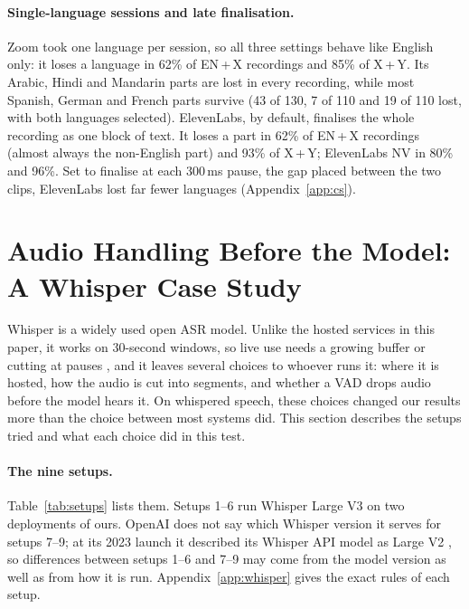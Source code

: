 \documentclass[11pt]{article}
\begin{document}
\paragraph{Single-language sessions and late finalisation.} Zoom took one language per session, so all three settings behave like English only: it loses a language in 62\% of EN\,+\,X recordings and 85\% of X\,+\,Y. Its Arabic, Hindi and Mandarin parts are lost in every recording, while most Spanish, German and French parts survive (43 of 130, 7 of 110 and 19 of 110 lost, with both languages selected). ElevenLabs, by default, finalises the whole recording as one block of text. It loses a part in 62\% of EN\,+\,X recordings (almost always the non-English part) and 93\% of X\,+\,Y; ElevenLabs NV in 80\% and 96\%. Set to finalise at each 300\,ms pause, the gap placed between the two clips, ElevenLabs lost far fewer languages (Appendix~\ref{app:cs}).

\FloatBarrier
\section{Audio Handling Before the Model: A Whisper Case Study}\label{sec:whisperguide}
Whisper is a widely used open ASR model. Unlike the hosted services in this paper, it works on 30-second windows, so live use needs a growing buffer \citep{machacek2023whisperstreaming} or cutting at pauses \citep{bain2023whisperx}, and it leaves several choices to whoever runs it: where it is hosted, how the audio is cut into segments, and whether a VAD drops audio before the model hears it. On whispered speech, these choices changed our results more than the choice between most systems did. This section describes the setups tried and what each choice did in this test.

\paragraph{The nine setups.} Table~\ref{tab:setups} lists them. Setups 1--6 run Whisper Large V3 on two deployments of ours. OpenAI does not say which Whisper version it serves for setups 7--9; at its 2023 launch it described its Whisper API model as Large V2 \citep{openaiwhisperapi}, so differences between setups 1--6 and 7--9 may come from the model version as well as from how it is run. Appendix~\ref{app:whisper} gives the exact rules of each setup.
\end{document}
